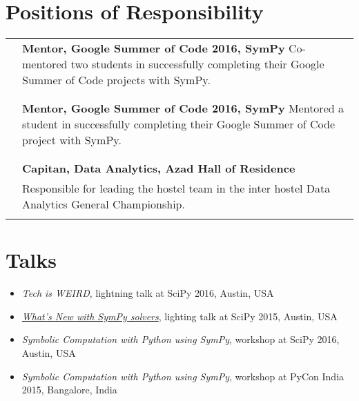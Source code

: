 \documentclass[a4paper,10pt]{article}
\begin{document}
\section{Positions of Responsibility}
\begin{tabular}{rp{12cm}}

    \textsc{} & \textbf{Mentor, Google Summer of Code 2016, SymPy}
    Co-mentored two students in successfully completing their Google Summer of
    Code projects with SymPy.
    \\&

\\\multicolumn{2}{c}{} \\


    \textsc{} & \textbf{Mentor, Google Summer of Code 2016, SymPy}
    Mentored a student in successfully completing their Google Summer of
    Code project with SymPy.
    \\&

\\\multicolumn{2}{c}{} \\

    \textsc{} & \textbf{Capitan, Data Analytics, Azad Hall of Residence}
    \\&
    Responsible for leading the hostel team in the inter hostel
    Data Analytics General Championship.
\\\multicolumn{2}{c}{} \\

\end{tabular}

\section{Talks}
\begin{itemize}
    \item \emph{Tech is WEIRD}, lightning talk at SciPy 2016, Austin, USA
    \item \emph{\href{https://www.youtube.com/watch?v=YCxQI4C34j8}{What's New with
        SymPy solvers}}, lighting talk at SciPy 2015, Austin, USA
    \item \emph{Symbolic Computation with Python using SymPy}, workshop at
        SciPy 2016, Austin, USA
    \item \emph{Symbolic Computation with Python using SymPy}, workshop at PyCon India
        2015, Bangalore, India
\end{itemize}

\end{document}
